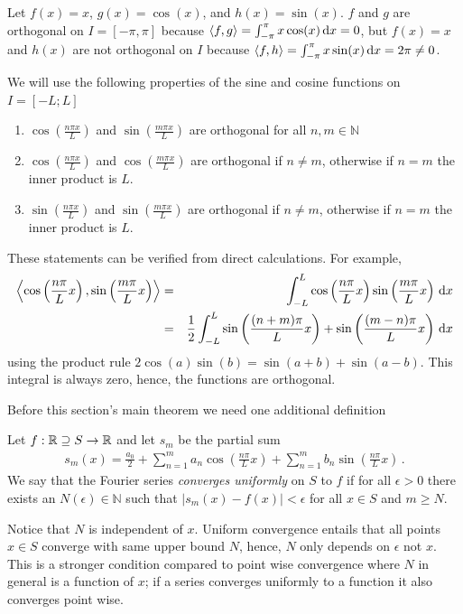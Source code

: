 \begin{example}
	Let $f(x)=x$, $g(x)=\cos(x)$, and $h(x) = \sin(x)$. $f$ and $g$ are orthogonal on $I=[-\pi, \pi]$ because
	$\langle f, g\rangle = \int_{-\pi}^{\pi} x \cos(x) \, \mathrm{d} x = 0$, but $f(x)=x$ and $h(x)$ are not 
	orthogonal on $I$ because $\langle f, h\rangle = \int_{-\pi}^{\pi} x \sin(x) \, \mathrm{d} x = 2\pi \neq
	0$.   
\end{example}

\bigskip

\noindent We will use the following properties of the sine and cosine functions on
$I=[-L;L]$ 
\begin{enumerate}
	\item $\cos\left(\frac{n\pi x}{L}\right)$ and  
		$\sin\left(\frac{m\pi x}{L}\right)$ are orthogonal for all $n,m
		\in \mathbb{N}$
	\item  $\cos\left(\frac{n\pi x}{L}\right)$ and  
		$\cos\left(\frac{m\pi x}{L}\right)$ are orthogonal if $n \neq
		m$, otherwise if $n=m$ the inner product is $L$.
	\item  $\sin\left(\frac{n\pi x}{L}\right)$ and  $\sin\left(\frac{m\pi
		x}{L}\right)$ are orthogonal if $n \neq
		m$, otherwise if $n=m$ the inner product is $L$.
\end{enumerate}
These statements can be verified from direct calculations. For example, 
\begin{eqnarray}
	\left \langle \cos\left(\frac{n\pi }{L}x\right), \sin\left(\frac{m\pi
	}{L}x\right) \right \rangle &=&  \int_{-L}^L \cos\left(\frac{n\pi}{L}x\right) \sin\left(\frac{m\pi
	}{L}x\right) \, \mathrm{d} x
	\nonumber \\
	&=& \frac{1}{2} \int_{-L}^L
	\sin\left(\frac{(n+m)\pi}{L}x\right)+\sin\left(\frac{(m-n)\pi}{L}x\right) \, \mathrm{d} x 
	\nonumber \\
\end{eqnarray}
using the product rule $2\cos(a)\sin(b) = \sin(a+b) + \sin(a-b)$. This integral is
always zero, hence, the functions are orthogonal. 

Before this section's main theorem we need one additional definition
\begin{definition}
	Let $f: \mathbb{R} \supseteq S \rightarrow \mathbb{R}$ and let $s_m$ be the partial sum 
	\begin{eqnarray}
		s_m(x) = \frac{a_0}{2} + \sum_{n=1}^m a_n \cos\left(\frac{n\pi}{L} x\right) + 
		\sum_{n=1}^m b_n \sin\left(\frac{n\pi}{L} x\right) \, .
	\end{eqnarray}
	We say that the Fourier series \emph{converges uniformly}  on $S$ to $f$ 
	if for all $\epsilon > 0$ there exists an $N(\epsilon) \in \mathbb{N}$ such that 
	$|s_m(x) - f(x)| < \epsilon$ for all $x \in S$ and $m \geq N$. 
\end{definition}
\noindent Notice that $N$ is independent of $x$. Uniform convergence entails that
all points $x \in S$ converge with same upper bound $N$, hence, $N$ only depends on $\epsilon$ not $x$. 
This is a stronger condition compared to point wise convergence where $N$ in general is a function of
$x$; if a series converges uniformly to a function it also converges point wise.

